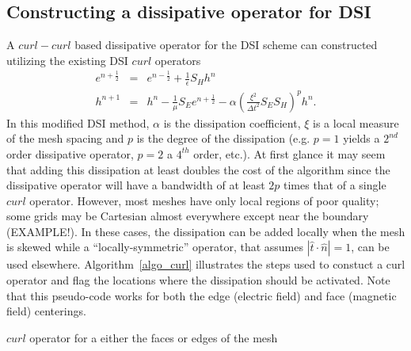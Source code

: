\documentclass[12pt]{article}
\begin{document}
\subsection{Constructing a dissipative operator for DSI}
A $curl-curl$ based dissipative operator for the DSI scheme can
constructed utilizing the existing DSI $curl$ operators
\begin{eqnarray}
e^{n+\frac{1}{2}} &=& e^{n-\frac{1}{2}}+\frac{1}{\epsilon}S_H h^n\\
h^{n+1} &=& h^{n} - \frac{1}{\mu}S_E e^{n+\frac{1}{2}} - \alpha\left(\frac{\xi^2}{\Delta t^2}S_ES_H \right)^ph^n.\label{eq:hdsi_disp}
\end{eqnarray}
In this modified DSI method, $\alpha$ is the dissipation coefficient,
$\xi$ is a local measure of the mesh spacing and $p$ is the degree of
the dissipation (e.g. $p=1$ yields a $2^{nd}$ order dissipative
operator, $p=2$ a $4^{th}$ order, etc.).  At first glance it may seem
that adding this dissipation at least doubles the cost of the
algorithm since the dissipative operator will have a bandwidth of at
least $2p$ times that of a single $curl$ operator.  However, most
meshes have only local regions of poor quality; some grids may be
Cartesian almost everywhere except near the boundary (EXAMPLE!).  In
these cases, the dissipation can be added locally when the mesh is
skewed while a ``locally-symmetric'' operator, that assumes $|\hat
t\cdot\hat n|=1$, can be used elsewhere.  Algorithm~\ref{algo_curl}
illustrates the steps used to constuct a curl operator and flag the
locations where the dissipation should be activated.  Note that this
pseudo-code works for both the edge (electric field) and face
(magnetic field) centerings.
\begin{algorithm}%
\dontprintsemicolon
{}
\label{algo_curl}
\caption{$curl$ operator for a either the faces or edges of the mesh}
\end{algorithm}
\end{document}
